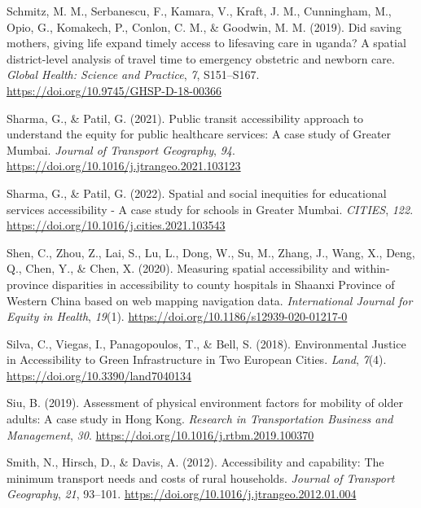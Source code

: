 \documentclass[
  letterpaper,
  DIV=11,
  numbers=noendperiod]{scrartcl}
\newlength{\cslhangindent}
\newenvironment{CSLReferences}[2] %
 {\begin{list}{}{%
  \setlength{\itemindent}{0pt}
  \setlength{\leftmargin}{0pt}
  \setlength{\parsep}{0pt}
  \ifodd #1
   \setlength{\leftmargin}{\cslhangindent}
   \setlength{\itemindent}{-1\cslhangindent}
  \fi
  \setlength{\itemsep}{#2\baselineskip}}}
 {\end{list}}
\begin{document}
\begin{CSLReferences}{1}{0}
Schmitz, M. M., Serbanescu, F., Kamara, V., Kraft, J. M., Cunningham,
M., Opio, G., Komakech, P., Conlon, C. M., \& Goodwin, M. M. (2019). Did
saving mothers, giving life expand timely access to lifesaving care in
uganda? A spatial district-level analysis of travel time to emergency
obstetric and newborn care. \emph{Global Health: Science and Practice},
\emph{7}, S151--S167. \url{https://doi.org/10.9745/GHSP-D-18-00366}

Sharma, G., \& Patil, G. (2021). Public transit accessibility approach
to understand the equity for public healthcare services: {A} case study
of {Greater Mumbai}. \emph{Journal of Transport Geography}, \emph{94}.
\url{https://doi.org/10.1016/j.jtrangeo.2021.103123}

Sharma, G., \& Patil, G. (2022). Spatial and social inequities for
educational services accessibility - {A} case study for schools in
{Greater Mumbai}. \emph{CITIES}, \emph{122}.
\url{https://doi.org/10.1016/j.cities.2021.103543}

Shen, C., Zhou, Z., Lai, S., Lu, L., Dong, W., Su, M., Zhang, J., Wang,
X., Deng, Q., Chen, Y., \& Chen, X. (2020). Measuring spatial
accessibility and within-province disparities in accessibility to county
hospitals in {Shaanxi Province} of {Western China} based on web mapping
navigation data. \emph{International Journal for Equity in Health},
\emph{19}(1). \url{https://doi.org/10.1186/s12939-020-01217-0}

Silva, C., Viegas, I., Panagopoulos, T., \& Bell, S. (2018).
Environmental {Justice} in {Accessibility} to {Green Infrastructure} in
{Two European Cities}. \emph{Land}, \emph{7}(4).
\url{https://doi.org/10.3390/land7040134}

Siu, B. (2019). Assessment of physical environment factors for mobility
of older adults: {A} case study in {Hong Kong}. \emph{Research in
Transportation Business and Management}, \emph{30}.
\url{https://doi.org/10.1016/j.rtbm.2019.100370}

Smith, N., Hirsch, D., \& Davis, A. (2012). Accessibility and
capability: The minimum transport needs and costs of rural households.
\emph{Journal of Transport Geography}, \emph{21}, 93--101.
\url{https://doi.org/10.1016/j.jtrangeo.2012.01.004}


\end{CSLReferences}
\end{document}
